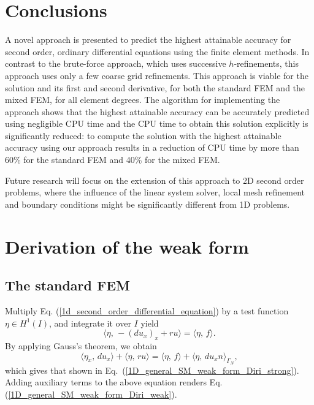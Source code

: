 \documentclass[review,3p]{elsarticle}
\begin{document}
\section{Conclusions}		\label{paragraph on conclusion}

A novel approach is presented to predict the highest attainable accuracy for second order, ordinary differential equations using the finite element methods.
In contrast to the brute-force approach, which uses successive $h$-refinements, this approach uses only a few coarse grid refinements. 
This approach is viable for the solution and its first and second derivative, for both the standard FEM and the mixed FEM, for all element degrees.
The algorithm for implementing the approach shows that the highest attainable accuracy can be accurately predicted using negligible CPU time and the CPU time to obtain this solution explicitly is significantly reduced: to compute the solution with the highest attainable accuracy using our approach results in a reduction of CPU time by more than 60\% for the standard FEM and 40\% for the mixed FEM.

Future research will focus on the extension of this approach to 2D second order problems, where the influence of the linear system solver, local mesh refinement and boundary conditions might be significantly different from 1D problems. 

\appendix

\section{Derivation of the weak form}		\label{weak form appendix}

\subsection{The standard FEM}		\label{derivation_weak_form_SM}

Multiply Eq. (\ref{1d_second_order_differential_equation}) by a test function $\eta \in H ^1 (I)$, and integrate it over $I$ yield
\begin{equation}
\langle \eta, \, -\left( d u_x \right)_x + ru \rangle = \langle \eta, \, f \rangle. \label{1D_general_inte}
\end{equation}
By applying Gauss's theorem, we obtain
\begin{equation}
 \langle {\eta} _x, \, d u_x \rangle + \langle \eta, \, ru \rangle = \langle \eta, \, f \rangle + \langle \eta, \, d u_x n \rangle_{ {\Gamma_N}},		\label{1D_general_gauss}
\end{equation}
which gives that shown in Eq.~({\ref{1D_general_SM_weak_form_Diri_strong}}). Adding auxiliary terms to the above equation renders Eq. (\ref{1D_general_SM_weak_form_Diri_weak}).
\end{document}
